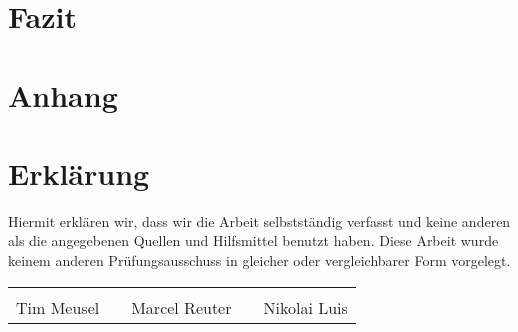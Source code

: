 \section{Fazit}

\newpage

\appendix

\printglossaries%

\newpage

\printbibliography[heading=bibnumbered]

\newpage

\section{Anhang}





\newpage

\section{Erklärung}
Hiermit erklären wir, dass wir die Arbeit selbstständig verfasst und keine
anderen als die angegebenen Quellen und Hilfsmittel benutzt haben. Diese Arbeit
wurde keinem anderen Prüfungsausschuss in gleicher oder vergleichbarer Form
vorgelegt.

\vfill
{\centering
\renewcommand{\arraystretch}{0.9}
\begin{tabular}{p{}p{}p{}p{}p{}}
  \dotfill                    & & \dotfill                      & & \dotfill \\
  \centering\footnotesize{Tim Meusel}& & \centering\footnotesize{Marcel Reuter}& & \centering\footnotesize{Nikolai Luis}%
\end{tabular}
}


